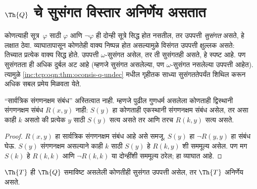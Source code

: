 \section[Q चे सुसंगत विस्तार अनिर्णेय असतात]{$\Th{Q}$ चे सुसंगत विस्तार अनिर्णेय असतात}\label{inc:tcp:cqn:sec}

\begin{explain}
कोणत्याही सूत्र~$\varphi$ साठी $\varphi$ आणि $\lnot \varphi$ ही दोन्ही सूत्रे
सिद्ध होत नसतील, तर उपपत्ती \emph{सुसंगत} असते, हे लक्षात ठेवा.
व्याघातापासून कोणतेही वाक्य निष्पन्न होत असल्यामुळे विसंगत उपपत्ती
क्षुल्लक असते: तिच्यात प्रत्येक वाक्य सिद्ध होते.
उपपत्ती $\omega$-सुसंगत असेल, तर ती सुसंगतही असते, हे स्पष्ट आहे.
पण सुसंगतता ही अधिक दुर्बल अट आहे (म्हणजे सुसंगत असलेल्या, पण
$\omega$-सुसंगत नसलेल्या उपपत्ती आहेत). त्यामुळे
\ref{inc:tcp:oqn:thm:oconsis-q-undec} मधील गृहीतक साध्या सुसंगततेपर्यंत
शिथिल करून अधिक सबल प्रमेय मिळवता येते.
\end{explain}

\begin{lem}
``सार्वत्रिक संगणनक्षम संबंध'' अस्तित्वात नाही. म्हणजे पुढील गुणधर्म
असलेला कोणताही द्विस्थानी संगणनक्षम संबंध $R(x,y)$ नाही:
$S(y)$ हा कोणताही एकस्थानी संगणनक्षम संबंध असेल, तर असा काही $k$
असतो की प्रत्येक $y$ साठी $S(y)$ सत्य असते तर आणि तरच
$R(k,y)$ सत्य असते.
\end{lem}

\begin{proof}
$R(x,y)$ हा सार्वत्रिक संगणनक्षम संबंध आहे असे समजू.
$S(y)$ हा $\lnot R(y,y)$ हा संबंध घेऊ. $S(y)$ संगणनक्षम असल्याने
काही $k$ साठी $S(y)$ हे $R(k,y)$ शी सममूल्य असेल.
पण मग $S(k)$ हे $R(k,k)$ आणि $\lnot R(k,k)$ या
दोन्हींशी सममूल्य ठरेल; हा व्याघात आहे.
\end{proof}


\begin{thm}
$\Th{T}$ ही $\Th{Q}$ समाविष्ट असलेली कोणतीही सुसंगत उपपत्ती
असेल, तर $\Th{T}$ अनिर्णेय असते.
\end{thm}


